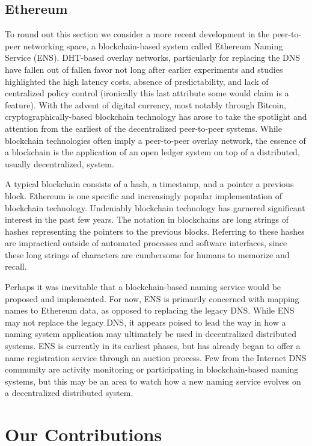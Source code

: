 \documentclass[sigconf]{acmart}
\begin{document}
\subsection{Ethereum}

To round out this section we consider a more recent development in the
peer-to-peer networking space, a blockchain-based system called Ethereum
Naming Service (ENS).\cite{johnson_ens_2017}  DHT-based overlay
networks, particularly for replacing the DNS have fallen out of fallen
favor not long after earlier experiments and studies highlighted the
high latency costs, absence of predictability, and lack of centralized
policy control (ironically this last attribute some would claim is a
feature).  With the advent of digital currency, most notably through
Bitcoin, cryptographically-based blockchain technology has arose to take
the spotlight and attention from the earliest of the decentralized
peer-to-peer systems.  While blockchain technologies often imply a
peer-to-peer overlay network, the essence of a blockchain is the
application of an open ledger system on top of a distributed, usually
decentralized, system.

A typical blockchain consists of a hash, a timestamp, and a pointer a
previous block.  Ethereum is one specific and increasingly popular
implementation of blockchain technology.  Undeniably blockchain
technology has garnered significant interest in the past few years.  The
notation in blockchains are long strings of hashes representing the
pointers to the previous blocks.  Referring to these hashes are
impractical outside of automated processes and software interfaces,
since these long strings of characters are cumbersome for humans to
memorize and recall.

Perhaps it was inevitable that a blockchain-based naming service would
be proposed and implemented.  For now, ENS is primarily concerned with
mapping names to Ethereum data, as opposed to replacing the legacy DNS.
While ENS may not replace the legacy DNS, it appears poised to lead the
way in how a naming system application may ultimately be used in
decentralized distributed systems.  ENS is currently in its earliest
phases, but has already began to offer a name registration service
through an auction process.  Few from the Internet DNS community are
activity monitoring or participating in blockchain-based naming systems,
but this may be an area to watch how a new naming service evolves on a
decentralized distributed system.

\section{Our Contributions}
\end{document}

